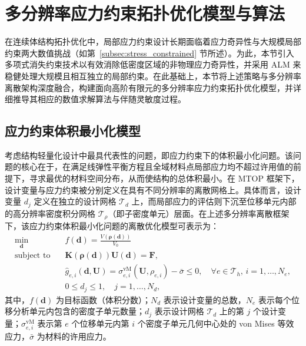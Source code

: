 \section{多分辨率应力约束拓扑优化模型与算法}
\label{sec:ch4_mtop_stress_constraint}

在连续体结构拓扑优化中，局部应力约束设计长期面临着应力奇异性与大规模局部约束两大数值挑战（如第~\ref{subsec:stress_constrained} 节所述）。为此，本节引入多项式消失约束技术以有效消除低密度区域的非物理应力奇异性，并采用 ALM 来稳健处理大规模且相互独立的局部约束。在此基础上，本节将上述策略与多分辨率离散架构深度融合，构建面向高阶有限元的多分辨率应力约束拓扑优化模型，并详细推导其相应的数值求解算法与伴随灵敏度过程。


\subsection{应力约束体积最小化模型}
\label{subsec:stress_constraint_model}

考虑结构轻量化设计中最具代表性的问题，即应力约束下的体积最小化问题。该问题的核心在于，在满足线弹性平衡方程且全域材料点局部应力均不超过许用值的前提下，寻求最优的材料空间分布，从而使结构的总体积最小。在 MTOP 框架下，设计变量与应力约束被分别定义在具有不同分辨率的离散网格上。具体而言，设计变量 $d_j$ 定义在独立的设计网格 $\mathcal{T}_d$ 上，而局部应力的评估则下沉至位移单元内部的高分辨率密度积分网格 $\mathcal{T}_\rho$（即子密度单元）层面。在上述多分辨率离散框架下，该应力约束体积最小化问题的离散优化模型可表示为：
\begin{equation} \label{eq:ch4_stress_mtop_model}
	\begin{aligned}
		\min_{\boldsymbol{d}} \quad & f(\boldsymbol{d}) = \frac{V(\boldsymbol{\rho}(\boldsymbol{d}))}{V_0} \\
		\text{subject to} \quad & \boldsymbol{K}(\boldsymbol{\rho}(\boldsymbol{d}))\boldsymbol{U}(\boldsymbol{d}) = \boldsymbol{F}, \\
		& \hat{g}_{e,i}(\boldsymbol{d}, \boldsymbol{U}) = \sigma_{e,i}^{\text{vM}}(\boldsymbol{U}, \rho_{e,i}) - \bar{\sigma} \le 0, \quad \forall e \in \mathcal{T}_h, \, i = 1, \dots, N_e, \\
		& 0 \le d_j \le 1, \quad j = 1, \dots, N_d,
	\end{aligned}
\end{equation}
其中，$f(\boldsymbol{d})$ 为目标函数（体积分数）；$N_d$ 表示设计变量的总数，$N_e$ 表示每个位移分析单元内包含的密度子单元数量；$d_j$ 表示设计网格 $\mathcal{T}_d$ 上的第 $j$ 个设计变量；$\sigma_{e,i}^{\text{vM}}$ 表示第 $e$ 个位移单元内第 $i$ 个密度子单元几何中心处的 von Mises 等效应力，$\bar{\sigma}$ 为材料的许用应力。

